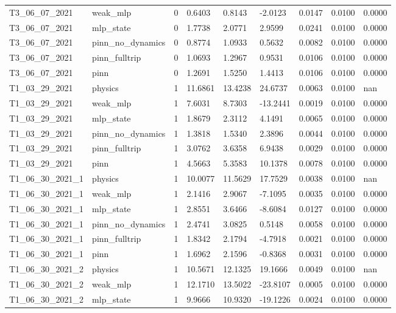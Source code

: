 \begin{table}[t]
\begin{tabular}{lllllllll}
T3\_06\_07\_2021 & weak\_mlp & 0 & 0.6403 & 0.8143 & -2.0123 & 0.0147 & 0.0100 & 0.0000 \\
T3\_06\_07\_2021 & mlp\_state & 0 & 1.7738 & 2.0771 & 2.9599 & 0.0241 & 0.0100 & 0.0000 \\
T3\_06\_07\_2021 & pinn\_no\_dynamics & 0 & 0.8774 & 1.0933 & 0.5632 & 0.0082 & 0.0100 & 0.0000 \\
T3\_06\_07\_2021 & pinn\_fulltrip & 0 & 1.0693 & 1.2967 & 0.9531 & 0.0106 & 0.0100 & 0.0000 \\
T3\_06\_07\_2021 & pinn & 0 & 1.2691 & 1.5250 & 1.4413 & 0.0106 & 0.0100 & 0.0000 \\
T1\_03\_29\_2021 & physics & 1 & 11.6861 & 13.4238 & 24.6737 & 0.0063 & 0.0100 & nan \\
T1\_03\_29\_2021 & weak\_mlp & 1 & 7.6031 & 8.7303 & -13.2441 & 0.0019 & 0.0100 & 0.0000 \\
T1\_03\_29\_2021 & mlp\_state & 1 & 1.8679 & 2.3112 & 4.1491 & 0.0065 & 0.0100 & 0.0000 \\
T1\_03\_29\_2021 & pinn\_no\_dynamics & 1 & 1.3818 & 1.5340 & 2.3896 & 0.0044 & 0.0100 & 0.0000 \\
T1\_03\_29\_2021 & pinn\_fulltrip & 1 & 3.0762 & 3.6358 & 6.9438 & 0.0029 & 0.0100 & 0.0000 \\
T1\_03\_29\_2021 & pinn & 1 & 4.5663 & 5.3583 & 10.1378 & 0.0078 & 0.0100 & 0.0000 \\
T1\_06\_30\_2021\_1 & physics & 1 & 10.0077 & 11.5629 & 17.7529 & 0.0038 & 0.0100 & nan \\
T1\_06\_30\_2021\_1 & weak\_mlp & 1 & 2.1416 & 2.9067 & -7.1095 & 0.0035 & 0.0100 & 0.0000 \\
T1\_06\_30\_2021\_1 & mlp\_state & 1 & 2.8551 & 3.6466 & -8.6084 & 0.0127 & 0.0100 & 0.0000 \\
T1\_06\_30\_2021\_1 & pinn\_no\_dynamics & 1 & 2.4741 & 3.0825 & 0.5148 & 0.0058 & 0.0100 & 0.0000 \\
T1\_06\_30\_2021\_1 & pinn\_fulltrip & 1 & 1.8342 & 2.1794 & -4.7918 & 0.0021 & 0.0100 & 0.0000 \\
T1\_06\_30\_2021\_1 & pinn & 1 & 1.6962 & 2.1596 & -0.8368 & 0.0031 & 0.0100 & 0.0000 \\
T1\_06\_30\_2021\_2 & physics & 1 & 10.5671 & 12.1325 & 19.1666 & 0.0049 & 0.0100 & nan \\
T1\_06\_30\_2021\_2 & weak\_mlp & 1 & 12.1710 & 13.5022 & -23.8107 & 0.0005 & 0.0100 & 0.0000 \\
T1\_06\_30\_2021\_2 & mlp\_state & 1 & 9.9666 & 10.9320 & -19.1226 & 0.0024 & 0.0100 & 0.0000 \\

\end{tabular}
\end{table}
